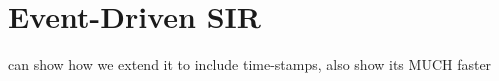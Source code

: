 \section{Event-Driven SIR}
can show how we extend it to include time-stamps, also show its MUCH faster